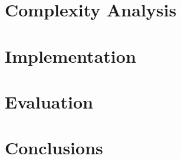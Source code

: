 \documentclass[10pt,twocolumn,letterpaper]{article}
\begin{document}
\section{Complexity Analysis}

\section{Implementation}


\section{Evaluation}




\section{Conclusions}


\nocite{hillstrom08,bottou11,elkan11}

{\small


}
\end{document}
